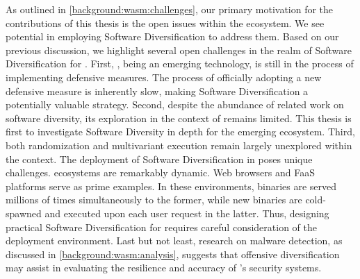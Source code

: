 \label{sota:openchallenges}
As outlined in \autoref{background:wasm:challenges}, our primary motivation for the contributions of this thesis is the open issues within the \Wasm ecosystem. 
We see potential in employing Software Diversification to address them. 
Based on our previous discussion, we highlight several open challenges in the realm of Software Diversification for \Wasm. 
First, \Wasm, being an emerging technology, is still in the process of implementing defensive measures. 
The process of officially adopting a new defensive measure is inherently slow, making Software Diversification a potentially valuable strategy. 
Second, despite the abundance of related work on software diversity, its exploration in the context of \Wasm remains limited. 
This thesis is first to investigate Software Diversity in depth for the emerging \Wasm ecosystem.
Third, both randomization and multivariant execution remain largely unexplored within the \Wasm context. 
The deployment of Software Diversification in \Wasm poses unique challenges. 
\Wasm ecosystems are remarkably dynamic. 
Web browsers and FaaS platforms serve as prime examples. 
In these environments, \Wasm binaries are served millions of times simultaneously to the former, while new \Wasm binaries are cold-spawned and executed upon each user request in the latter. 
Thus, designing practical Software Diversification for \Wasm requires careful consideration of the deployment environment. 
Last but not least, research on malware detection, as discussed in \autoref{background:wasm:analysis}, suggests that offensive diversification may assist in evaluating the resilience and accuracy of \Wasm's security systems.







